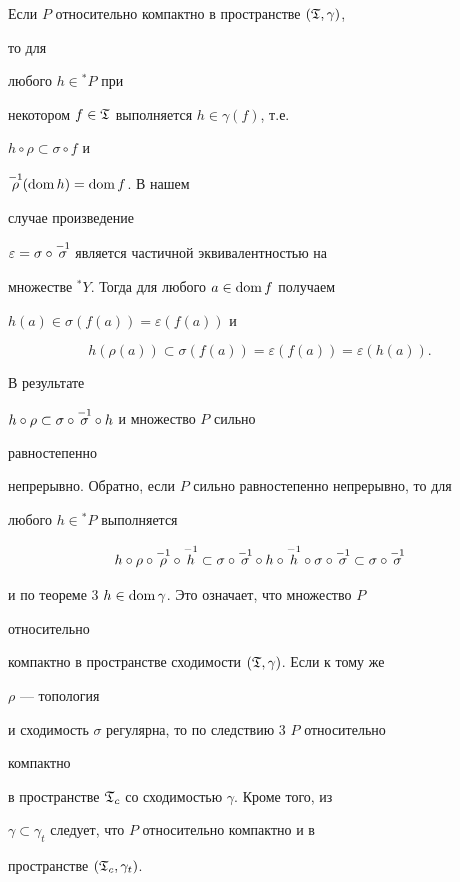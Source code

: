 \begin{pf}


Если $P$ относительно компактно в пространстве $(\frak T,\gamma)$,


то для


любого $h\in{}^*P$ при


некотором $f\in\frak T$ выполняется $h\in\gamma(f)$, т.е.


$h\circ \rho\subset\sigma\circ f$ и


$\overset{-1}{\rho}{} (\operatorname{dom} h)=\operatorname{dom} f$. В нашем


случае произведение


$\varepsilon=\sigma\circ \overset{-1}{\sigma}{}$ является частичной эквивалентностью на


множестве ${}^*Y$. Тогда для любого $a\in\operatorname{dom} f$ получаем


$h(a)\in\sigma(f(a))=\varepsilon(f(a))$ и


$$


h(\rho(a))\subset\sigma(f(a))=\varepsilon(f(a))=\varepsilon(h(a)).


$$


В результате


$h\circ \rho\subset\sigma\circ \overset{-1}{\sigma}{} \circ h$ и множество $P$ сильно


равностепенно


непрерывно. Обратно, если $P$ сильно равностепенно непрерывно, то для


любого $h\in{}^*P$ выполняется


$$


h\circ \rho \circ \mir \circ \mih \subset\sigma\circ \mis


\circ h\circ \mih \circ \sigma\circ \mis \subset \sigma\circ \mis


$$


и по теореме 3\; $h\in\operatorname{dom}\gamma$. Это означает, что множество $P$


относительно


компактно в пространстве сходимости $(\frak T,\gamma)$. Если к тому же


$\rho$ --- топология


и сходимость $\sigma$ регулярна, то по следствию 3\; $P$ относительно


компактно


в пространстве $\frak T_c$ со сходимостью $\gamma$. Кроме того, из


$\gamma\subset\gamma_t$ следует, что $P$ относительно компактно и в


пространстве $(\frak T_c,\gamma_t)$.


\end{pf}





